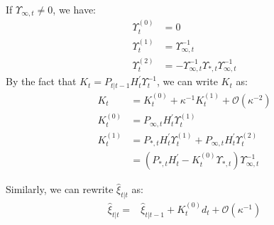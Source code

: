 \documentclass[10pt]{article}
\numberwithin{equation}{section}
\begin{document}
If $\Upsilon_{\infty,t}\neq 0$, we have:
\begin{align*}
    \Upsilon_t^{(0)} &= 0 \\
    \Upsilon_t^{(1)} &= \Upsilon_{\infty,t}^{-1} \\
    \Upsilon_t^{(2)} &= -\Upsilon_{\infty,t}^{-1}\Upsilon_{*,t}\Upsilon_{\infty,t}^{-1}
\end{align*}
By the fact that $K_t = P_{t|t-1}H_t^{'}\Upsilon_t^{-1}$, we can write $K_t$ as:
\begin{align}
    K_t &= K_t^{(0)} + \kappa^{-1}K_t^{(1)} + \mathcal{O}(\kappa^{-2}) \label{eq:K1_diffuse_start} \\
    K_t^{(0)} &= P_{\infty,t}H_t^{'}\Upsilon_t^{(1)} \\
    K_t^{(1)} &= P_{*,t}H_t^{'}\Upsilon_t^{(1)} + P_{\infty,t}H_t^{'}\Upsilon_t^{(2)} \nonumber \\
    &= (P_{*,t}H_t^{'}-K_t^{(0)}\Upsilon_{*,t})\Upsilon_{\infty,t}^{-1} \label{eq:K1_diffuse_end}
\end{align}

Similarly, we can rewrite $\hat{\xi}_{t|t}$ as:
\begin{align}
    \hat{\xi}_{t|t} =& \hat{\xi}_{t|t-1} + K_t^{(0)}d_t + \mathcal{O}(\kappa^{-1}) \label{eq:diff_xi1} 
\end{align}
\end{document}
